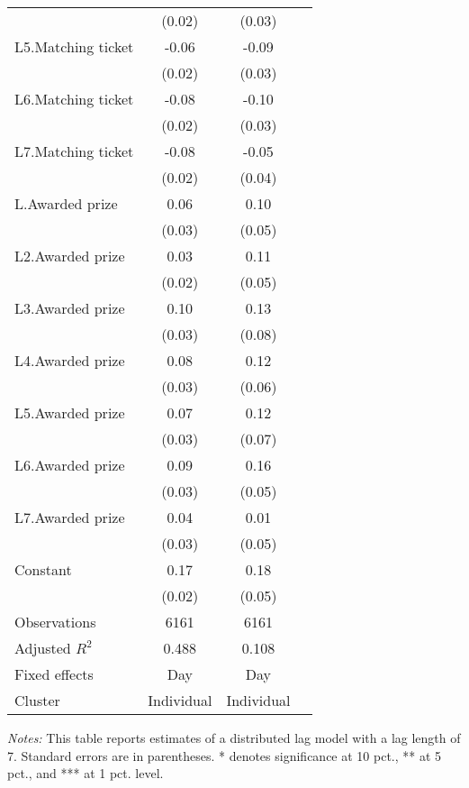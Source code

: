 \begin{table}[htbp]
{\begin{threeparttable}
\begin{tabular}{l*{3}{c}}
                &   (0.02)         &   (0.03)         \\
L5.Matching ticket&    -0.06\sym{***}&    -0.09\sym{***}\\
                &   (0.02)         &   (0.03)         \\
L6.Matching ticket&    -0.08\sym{***}&    -0.10\sym{***}\\
                &   (0.02)         &   (0.03)         \\
L7.Matching ticket&    -0.08\sym{***}&    -0.05         \\
                &   (0.02)         &   (0.04)         \\
L.Awarded prize &     0.06\sym{**} &     0.10\sym{*}  \\
                &   (0.03)         &   (0.05)         \\
L2.Awarded prize&     0.03         &     0.11\sym{*}  \\
                &   (0.02)         &   (0.05)         \\
L3.Awarded prize&     0.10\sym{***}&     0.13         \\
                &   (0.03)         &   (0.08)         \\
L4.Awarded prize&     0.08\sym{***}&     0.12\sym{*}  \\
                &   (0.03)         &   (0.06)         \\
L5.Awarded prize&     0.07\sym{**} &     0.12\sym{*}  \\
                &   (0.03)         &   (0.07)         \\
L6.Awarded prize&     0.09\sym{***}&     0.16\sym{***}\\
                &   (0.03)         &   (0.05)         \\
L7.Awarded prize&     0.04         &     0.01         \\
                &   (0.03)         &   (0.05)         \\
Constant        &     0.17\sym{***}&     0.18\sym{***}\\
                &   (0.02)         &   (0.05)         \\
\midrule
Observations    &     6161         &     6161         \\
Adjusted \(R^{2}\)&    0.488         &    0.108         \\
Fixed effects   &      Day         &      Day         \\
Cluster         &Individual         &Individual         \\
\bottomrule \end{tabular} \begin{tablenotes}[flushleft] \footnotesize \item \emph{Notes:} This table reports estimates of a distributed lag model with a lag length of 7. Standard errors are in parentheses. * denotes significance at 10 pct., ** at 5 pct., and *** at 1 pct. level. \end{tablenotes} \end{threeparttable} } \end{table}
